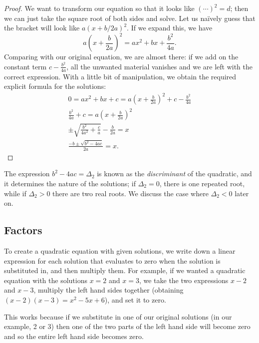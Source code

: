 \documentclass[a4paper,10pt,titlepage]{article}
\theoremstyle{definition}
\begin{document}
\begin{proof}
  We want to transform our equation so that it looks like $ (\cdots)^2 = d $; then we can just take the square root of both sides and
  solve. Let us na\"ively guess that the bracket will look like $ a(x + b/2a)^2 $. If we expand this, we have
  \begin{displaymath}
    a\left(x + \frac{b}{2a}\right)^2 = ax^2 + bx + \frac{b^2}{4a}.
  \end{displaymath}
  Comparing with our original equation, we are almost there: if we add on the constant term $ c - \frac{b^2}{4a} $, all the unwanted
  material vanishes and we are left with the correct expression. With a little bit of manipulation, we obtain the required explicit
  formula for the solutions:
  \begin{gather*}
    0 = ax^2 + bx + c = a\left(x + \frac{b}{2a}\right)^2 + c - \frac{b^2}{4a}\\
    \frac{b^2}{4a} + c = a\left(x + \frac{b}{2a}\right)^2\\
    \pm\sqrt{\frac{b^2}{4a^2} + \frac{c}{a}} - \frac{b}{2a} = x\\
    \frac{-b \pm \sqrt{b^2 - 4ac}}{2a} = x.
  \end{gather*}
\end{proof}

The expression $ b^2 - 4ac = \Delta_2 $ is known as the \textit{discriminant} of the
quadratic, and it determines the nature of the solutions; if $ \Delta_2 = 0 $, there is
one repeated root, while if $ \Delta_2 > 0 $ there are two real roots. We discuss the case
where $ \Delta_2 < 0 $ later on.

\subsection*{Factors}
To create a quadratic equation with given solutions, we write down a linear expression
for each solution that evaluates to zero when the solution is substituted in, and then multiply
them. For example, if we wanted a quadratic equation with the solutions $ x = 2 $ and $ x = 3 $,
we take the two expressions $ x - 2 $ and $ x - 3 $, multiply the left hand sides together
(obtaining $ (x-2)(x-3) = x^2 - 5x + 6 $), and set it to zero.

This works because if we substitute in one of our original solutions (in our
example, 2 or 3) then one of the two parts of the left hand side will become zero
and so the entire left hand side becomes zero.
\end{document}
